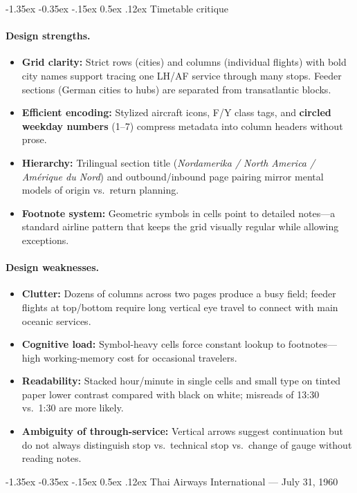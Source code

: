 \documentclass[11pt]{article}
\makeatletter
\renewcommand\subsection{\@startsection{subsection}{2}{\z@}%
  {-1.35ex \@plus -0.35ex \@minus -.15ex}%
  {0.5ex \@plus .12ex}%
  {\normalfont\large\bfseries}}
\newcommand{\strengths}{\paragraph{Design strengths.}}
\newcommand{\weaknesses}{\paragraph{Design weaknesses.}}
\makeatother
\begin{document}
\subsection{Timetable critique}

\strengths
\begin{itemize}
  \item \textbf{Grid clarity:} Strict rows (cities) and columns (individual flights) with bold city names support tracing one LH/AF service through many stops. Feeder sections (German cities to hubs) are separated from transatlantic blocks.
  \item \textbf{Efficient encoding:} Stylized aircraft icons, F/Y class tags, and \textbf{circled weekday numbers} (1--7) compress metadata into column headers without prose.
  \item \textbf{Hierarchy:} Trilingual section title (\emph{Nordamerika / North America / Amérique du Nord}) and outbound/inbound page pairing mirror mental models of origin vs.\ return planning.
  \item \textbf{Footnote system:} Geometric symbols in cells point to detailed notes---a standard airline pattern that keeps the grid visually regular while allowing exceptions.
\end{itemize}

\weaknesses
\begin{itemize}
  \item \textbf{Clutter:} Dozens of columns across two pages produce a busy field; feeder flights at top/bottom require long vertical eye travel to connect with main oceanic services.
  \item \textbf{Cognitive load:} Symbol-heavy cells force constant lookup to footnotes---high working-memory cost for occasional travelers.
  \item \textbf{Readability:} Stacked hour/minute in single cells and small type on tinted paper lower contrast compared with black on white; misreads of 13:30 vs.\ 1:30 are more likely.
  \item \textbf{Ambiguity of through-service:} Vertical arrows suggest continuation but do not always distinguish stop vs.\ technical stop vs.\ change of gauge without reading notes.
\end{itemize}

\subsection{Thai Airways International --- July 31, 1960}
\end{document}
